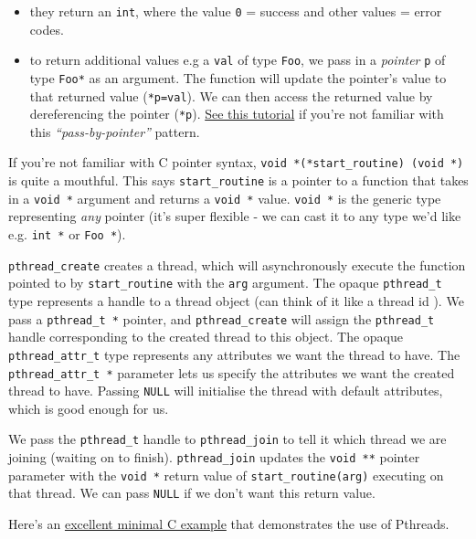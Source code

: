\begin{itemize}
\tightlist
\item
  they return an \texttt{int}, where the value \texttt{0} = success and
  other values = error codes.
\item
  to return additional values e.g a \texttt{val} of type \texttt{Foo},
  we pass in a \emph{pointer} \texttt{p} of type \texttt{Foo*} as an
  argument. The function will update the pointer's value to that
  returned value (\texttt{*p=val}). We can then access the returned
  value by dereferencing the pointer (\texttt{*p}).
  \href{https://www.ibm.com/support/knowledgecenter/SSLTBW_2.4.0/com.ibm.zos.v2r4.cbclx01/pass_by_pointer.htm}{See
  this tutorial} if you're not familiar with this
  \emph{``pass-by-pointer''} pattern.
\end{itemize}

If you're not familiar with C pointer syntax,
\texttt{void\ *(*start\_routine)\ (void\ *)} is quite a mouthful. This
says \texttt{start\_routine} is a pointer to a function that takes in a
\texttt{void\ *} argument and returns a \texttt{void\ *} value.
\texttt{void\ *} is the generic type representing \emph{any} pointer
(it's super flexible - we can cast it to any type we'd like e.g.
\texttt{int\ *} or \texttt{Foo\ *}).

\texttt{pthread\_create} creates a thread, which will asynchronously
execute the function pointed to by \texttt{start\_routine} with the
\texttt{arg} argument. The opaque \texttt{pthread\_t} type represents a
handle to a thread object (can think of it like a thread id ). We pass a
\texttt{pthread\_t\ *} pointer, and \texttt{pthread\_create} will assign
the \texttt{pthread\_t} handle corresponding to the created thread to
this object. The opaque \texttt{pthread\_attr\_t} type represents any
attributes we want the thread to have. The \texttt{pthread\_attr\_t\ *}
parameter lets us specify the attributes we want the created thread to
have. Passing \texttt{NULL} will initialise the thread with default
attributes, which is good enough for us.

We pass the \texttt{pthread\_t} handle to \texttt{pthread\_join} to tell
it which thread we are joining (waiting on to finish).
\texttt{pthread\_join} updates the \texttt{void\ **} pointer parameter
with the \texttt{void\ *} return value of \texttt{start\_routine(arg)}
executing on that thread. We can pass \texttt{NULL} if we don't want
this return value.

Here's an
\href{https://timmurphy.org/2010/05/04/pthreads-in-c-a-minimal-working-example/}{excellent
minimal C example} that demonstrates the use of Pthreads.

